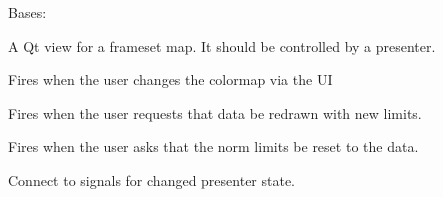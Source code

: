 \documentclass[letterpaper,10pt,english]{sphinxmanual}
\begin{document}
\begin{fulllineitems}
\label{\detokenize{xanespy:xanespy.qt_map_view.QtMapView}}
Bases: 

A Qt view for a frameset map. It should be controlled by a
presenter.

\begin{fulllineitems}
\label{\detokenize{xanespy:xanespy.qt_map_view.QtMapView.cmap_changed}}
 \textendash{} Fires when the user changes the colormap via the UI

\end{fulllineitems}


\begin{fulllineitems}
\label{\detokenize{xanespy:xanespy.qt_map_view.QtMapView.limits_applied}}
 \textendash{} Fires when the user requests that data be redrawn with new limits.

\end{fulllineitems}


\begin{fulllineitems}
\label{\detokenize{xanespy:xanespy.qt_map_view.QtMapView.limits_reset}}
 \textendash{} Fires when the user asks that the norm limits be reset to the data.

\end{fulllineitems}


\begin{fulllineitems}
\end{fulllineitems}


\begin{fulllineitems}
\label{\detokenize{xanespy:xanespy.qt_map_view.QtMapView.connect_presenter}}
Connect to signals for changed presenter state.


\end{fulllineitems}
\end{fulllineitems}
\end{document}
